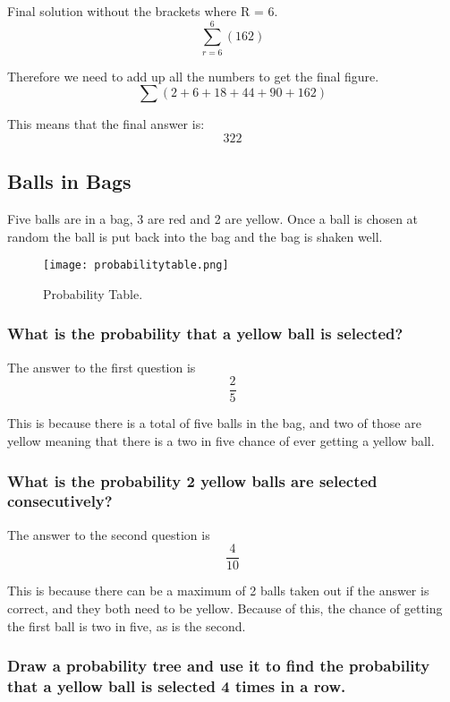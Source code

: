 \documentclass[a4paper,12pt]{article}
\begin{document}
Final solution without the brackets where R = 6.
$$\sum^6_{r=6} (162)$$

\newpage

Therefore we need to add up all the numbers to get the final figure.
$$\sum (2 + 6 + 18 + 44 + 90 + 162)$$

This means that the final answer is:
$$322$$

\newpage

\subsection{Balls in Bags}

Five balls are in a bag, 3 are red and 2 are yellow. Once a ball is chosen at random the ball is put back into the bag and the bag is shaken well.

\begin{figure}[h!]
  \texttt{[image: probabilitytable.png]}
  \caption{Probability Table.}
  \label{fig:chart1}
\end{figure}

\newpage

\subsubsection{What is the probability that a yellow ball is selected?}

The answer to the first question is $$\frac{2}{5}$$

This is because there is a total of five balls in the bag, and two of those are yellow meaning that there is a two in five chance of ever getting a yellow ball.

\subsubsection{What is the probability 2 yellow balls are selected consecutively?}

The answer to the second question is $$\frac{4}{10}$$

This is because there can be a maximum of 2 balls taken out if the answer is correct, and they both need to be yellow. Because of this, the chance of getting the first ball is two in five, as is the second.

\subsubsection{Draw a probability tree and use it to find the probability that a yellow ball is selected 4 times in a row.}
\end{document}
